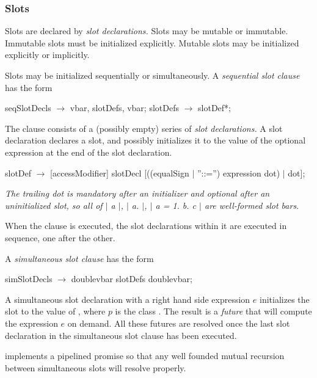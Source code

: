 \documentclass{article}
\newcommand{\code}[1]{{\sf #1}}
\begin{document}
\subsubsection{Slots}
\label{slots}

Slots are declared by {\em slot declarations.} 
Slots may be mutable or immutable. Immutable slots must be initialized explicitly. Mutable slots may be initialized explicitly or implicitly. 

Slots may be initialized sequentially or simultaneously. A {\em sequential slot clause} has the form 
\begin{newspeak}
seqSlotDecls $\rightarrow$ vbar, slotDefs, vbar;
slotDefs $\rightarrow$ slotDef*;
\end{newspeak}

The clause consists of a (possibly empty) series of {\em slot declarations.}  A slot declaration declares a slot, and possibly initializes it to the value of the optional expression at the end of the slot declaration.
\begin{newspeak}
slotDef $\rightarrow$  [accessModifier] slotDecl
     [((equalSign $|$ ''::='') expression dot) $|$ dot];
\end{newspeak}

{\it
The trailing dot is mandatory after an initializer and optional after an uninitialized slot, so all of  \code{$|$ a $|$}, \code{$|$ a. $|$}, \code{$|$ a = 1. b. c $|$} are well-formed slot bars.
}



When the clause is executed, the slot declarations within it are executed in sequence, one after the other.

A {\em simultaneous slot  clause} has the form 
\begin{newspeak}
simSlotDecls $\rightarrow$ doublevbar slotDefs doublevbar;
\end{newspeak}
 
A simultaneous slot declaration with a right hand side expression $e$ initializes the slot to the value of  , where $p$ is the class . The result is a {\em future} that will compute the expression $e$ on demand.   All these futures are resolved once the last slot declaration in the simultaneous slot  clause has been executed.

 implements a pipelined promise so that any well founded mutual recursion between simultaneous slots will resolve properly.


 
\end{document}
